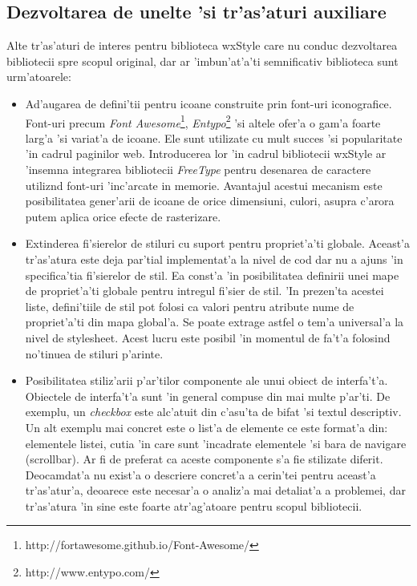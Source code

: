 \subsection{Dezvoltarea de unelte 'si tr'as'aturi auxiliare}

Alte tr'as'aturi de interes pentru biblioteca wxStyle care nu conduc dezvoltarea bibliotecii spre scopul original, dar ar 'imbun'at'a'ti semnificativ biblioteca sunt urm'atoarele:

\begin{itemize}
\item Ad'augarea de defini'tii pentru icoane construite prin font-uri iconografice. Font-uri precum \emph{Font Awesome}\footnote{http://fortawesome.github.io/Font-Awesome/}, \emph{Entypo}\footnote{http://www.entypo.com/} 'si altele ofer'a o gam'a foarte larg'a 'si variat'a de icoane. Ele sunt utilizate cu mult succes 'si popularitate 'in cadrul paginilor web. Introducerea lor 'in cadrul bibliotecii wxStyle ar 'insemna integrarea bibliotecii \emph{FreeType} pentru desenarea de caractere utiliz{\ia}nd font-uri 'inc'arcate in memorie. Avantajul acestui mecanism este posibilitatea gener'arii de icoane de orice dimensiuni, culori, asupra c'arora putem aplica orice efecte de rasterizare.
\item Extinderea fi'sierelor de stiluri cu suport pentru propriet'a'ti globale. Aceast'a tr'as'atura este deja par'tial implementat'a la nivel de cod dar nu a ajuns 'in specifica'tia fi'sierelor de stil. Ea const'a 'in posibilitatea definirii unei mape de propriet'a'ti globale pentru intregul fi'sier de stil. 'In prezen'ta acestei liste, defini'tiile de stil pot folosi ca valori pentru atribute nume de propriet'a'ti din mapa global'a. Se poate extrage astfel o tem'a universal'a la nivel de stylesheet. Acest lucru este posibil 'in momentul de fa't'a folosind no'tinuea de stiluri p'arinte.
\item Posibilitatea stiliz'arii p'ar'tilor componente ale unui obiect de interfa't'a. Obiectele de interfa't'a sunt 'in general compuse din mai multe p'ar'ti. De exemplu, un \emph{checkbox} este alc'atuit din c'asu'ta de bifat 'si textul descriptiv. Un alt exemplu mai concret este o list'a de elemente ce este format'a din: elementele listei, cutia 'in care sunt 'incadrate elementele 'si bara de navigare (scrollbar). Ar fi de preferat ca aceste componente s'a fie stilizate diferit. Deocamdat'a nu exist'a o descriere concret'a a cerin'tei pentru aceast'a tr'as'atur'a, deoarece este necesar'a o analiz'a mai detaliat'a a problemei, dar tr'as'atura 'in sine este foarte atr'ag'atoare pentru scopul bibliotecii.

\end{itemize}
